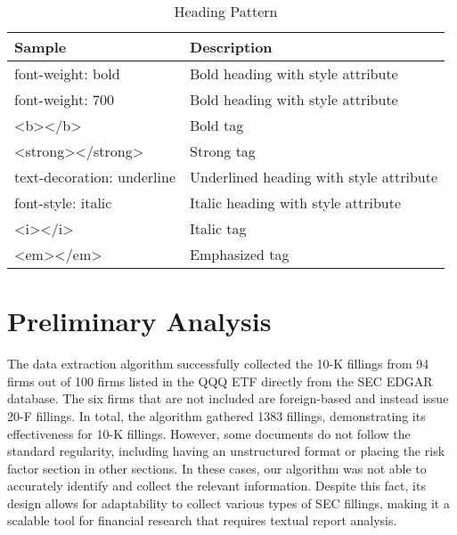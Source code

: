 \documentclass[logo,bsc,singlespacing,parskip]{infthesis}
\begin{document}
\begin{table}[ht]
    \centering
    \begin{tabular}{|l|l|}
        \hline
        \textbf{Sample} & \textbf{Description} \\
        \hline
        {\scriptsize font-weight: bold} & {\scriptsize Bold heading with style attribute} \\
        \hline
        \scriptsize{font-weight: 700} & {\scriptsize Bold heading with style attribute}  \\
        \hline
        \scriptsize{\textless b\textgreater\textless/b\textgreater} & {\scriptsize Bold tag}  \\
        \hline
        \scriptsize{<strong></strong>} & {\scriptsize Strong tag}  \\
        \hline
        \scriptsize{text-decoration: underline} & {\scriptsize Underlined heading with style attribute}  \\
        \hline
        \scriptsize{font-style: italic} & {\scriptsize Italic heading with style attribute} \\
        \hline
        \scriptsize{\textless i\textgreater\textless /i\textgreater} & {\scriptsize Italic tag} \\
        \hline
        \scriptsize{\textless em\textgreater\textless/em\textgreater} & {\scriptsize Emphasized tag} \\
        \hline
        
    \end{tabular}
    \caption{Heading Pattern}
    \label{tab:pattern}
\end{table}




\section{Preliminary Analysis}
The data extraction algorithm successfully collected the 10-K fillings from 94 firms out of 100 firms listed in the QQQ ETF directly from the SEC EDGAR database. The six firms that are not included are foreign-based and instead issue 20-F fillings. In total, the algorithm gathered 1383 fillings, demonstrating its effectiveness for 10-K fillings. However, some documents do not follow the standard regularity, including having an unstructured format or placing the risk factor section in other sections. In these cases, our algorithm was not able to accurately identify and collect the relevant information. Despite this fact, its design allows for adaptability to collect various types of SEC fillings, making it a scalable tool for financial research that requires textual report analysis. 
\end{document}
